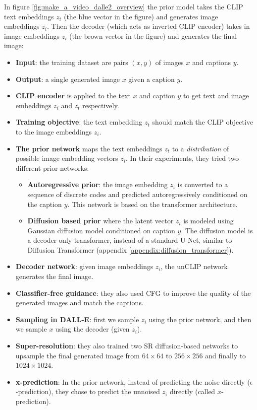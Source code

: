 In figure \ref{fig:make_a_video_dalle2_overview} the prior model takes the CLIP text embeddings $z_t$ (the blue vector in the figure) and generates image embeddings $z_i$. Then the decoder (which acts as inverted CLIP encoder) takes in image embeddings $z_i$ (the brown vector in the figure) and generates the final image:

\begin{itemize}
    \item \textbf{Input}: the training dataset are pairs $(x,y)$ of images $x$ and captions $y$.
    \item \textbf{Output}: a single generated image $x$ given a caption $y$.
    \item \textbf{CLIP encoder} is applied to the text $x$ and caption $y$ to get text and image embeddings $z_i$ and $z_t$ respectively.
    \item \textbf{Training objective}: the text embedding $z_t$ should match the CLIP objective to the image embeddings $z_i$.
    \item \textbf{The prior network} maps the text embeddings $z_t$ to a \textit{distribution} of possible image embedding vectors $z_i$. In their experiments, they tried two different prior networks:
        \begin{itemize}
            \item \textbf{Autoregressive prior}: the image embedding $z_i$ is converted to a sequence of discrete codes and predicted autoregressively conditioned on the caption $y$. This network is based on the transformer architecture.
            \item \textbf{Diffusion based prior} where the latent vector $z_i$ is modeled using Gaussian diffusion model conditioned on caption $y$. The diffusion model is a decoder-only transformer, instead of a standard U-Net, similar to Diffusion Transformer \cite{diffusion_transformer} (appendix \ref{appendix:diffusion_transformer}).
        \end{itemize}
    \item \textbf{Decoder network}: given image embeddings $z_i$, the unCLIP network generates the final image. 
    \item \textbf{Classifier-free guidance}: they also used CFG to improve the quality of the generated images and match the captions.
    \item \textbf{Sampling in DALL-E}: first we sample $z_i$ using the prior network, and then we sample $x$ using the decoder (given $z_i$).
    \item \textbf{Super-resolution}: they also trained two SR diffusion-based networks to upsample the final generated image from $64\times 64$ to $256\times 256$ and finally to $1024\times 1024$.
    \item \textbf{x-prediction}: In the prior network, instead of predicting the noise directly ($\epsilon$-prediction), they chose to predict the unnoised $z_i$ directly (called $x$-prediction).
\end{itemize}








